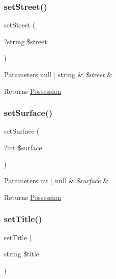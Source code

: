 \subsubsection{\texorpdfstring{setStreet()}{setStreet()}}
{\footnotesize\ttfamily set\+Street (\begin{DoxyParamCaption}\item[{?string}]{\$street }\end{DoxyParamCaption})}


\begin{DoxyParams}[1]{Parameters}
null | string & {\em \$street} & \\
\hline
\end{DoxyParams}
\begin{DoxyReturn}{Returns}
\mbox{\hyperlink{class_app_1_1_entity_1_1_possession}{Possession}} 
\end{DoxyReturn}
\mbox{\label{class_app_1_1_entity_1_1_possession_a0cc7d745f571f40e9bc6a30bfece6159}} 
\subsubsection{\texorpdfstring{setSurface()}{setSurface()}}
{\footnotesize\ttfamily set\+Surface (\begin{DoxyParamCaption}\item[{?int}]{\$surface }\end{DoxyParamCaption})}


\begin{DoxyParams}[1]{Parameters}
int | null & {\em \$surface} & \\
\hline
\end{DoxyParams}
\begin{DoxyReturn}{Returns}
\mbox{\hyperlink{class_app_1_1_entity_1_1_possession}{Possession}} 
\end{DoxyReturn}
\mbox{\label{class_app_1_1_entity_1_1_possession_a754ef3032cc3ffb25ad2d1a13720fc29}} 
\subsubsection{\texorpdfstring{setTitle()}{setTitle()}}
{\footnotesize\ttfamily set\+Title (\begin{DoxyParamCaption}\item[{string}]{\$title }\end{DoxyParamCaption})}


